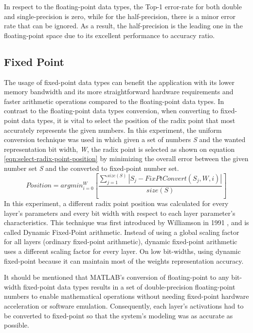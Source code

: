 In respect to the floating-point data types, the Top-1 error-rate for both double and single-precision is zero, while for the half-precision, there is a minor error rate that can be ignored. As a result, the half-precision is the leading one in the floating-point space due to its excellent performance to accuracy ratio.

\subsection{Fixed Point}
\label{sec:fixed-point}
The usage of fixed-point data types can benefit the application with its lower memory bandwidth and its more straightforward hardware requirements and faster arithmetic operations compared to the floating-point data types. In contrast to the floating-point data types conversion, when converting to fixed-point data types, it is vital to select the position of the radix point that most accurately represents the given numbers. In this experiment, the uniform conversion technique was used in which given a set of numbers \emph{S} and the wanted representation bit width, \emph{W}, the radix point is selected as shown on equation \ref{eqn:select-radix-point-position} by minimizing the overall error between the given number set \emph{S} and the converted to fixed-point number set.
\begin{equation}
	\label{eqn:select-radix-point-position}
	Position = argmin_{i=0}^{W}[\frac{\sum_{j=1}^{size(S)} |S_j - FixPtConvert(S_j, W, i)| }{size(S)}]
\end{equation}
In this experiment, a different radix point position was calculated for every layer's parameters and every bit width with respect to each layer parameter's characteristics. This technique was first introduced by Williamson in 1991 \cite{Dynamically-scaled-fixed-point-arithmetic}, and is called Dynamic Fixed-Point arithmetic. Instead of using a global scaling factor for all layers (ordinary fixed-point arithmetic), dynamic fixed-point arithmetic uses a different scaling factor for every layer. On low bit-widths, using dynamic fixed-point because it can maintain most of the weights representation accuracy.

It should be mentioned that MATLAB's conversion of floating-point to any bit-width fixed-point data types results in a set of double-precision floating-point numbers to enable mathematical operations without needing fixed-point hardware acceleration or software emulation. Consequently, each layer's activations had to be converted to fixed-point so that the system's modeling was as accurate as possible.


